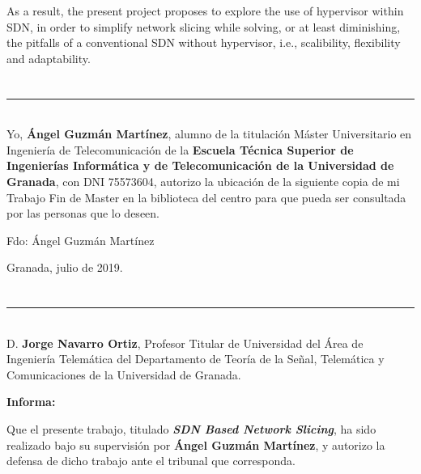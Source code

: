 As a result, the present project proposes to explore the use of hypervisor within SDN, in order to simplify network slicing while solving, or at least diminishing, the pitfalls of a conventional SDN without hypervisor, i.e., scalibility, flexibility and adaptability.

\chapter*{}
\thispagestyle{empty}

\noindent\rule[-1ex]{\textwidth}{2pt}\\[4.5ex]

Yo, \textbf{Ángel Guzmán Martínez}, alumno de la titulación Máster Universitario en Ingeniería de Telecomunicación de la \textbf{Escuela Técnica Superior de Ingenierías Informática y de Telecomunicación de la Universidad de Granada}, con DNI 75573604, autorizo la ubicación de la siguiente copia de mi Trabajo Fin de Master en la biblioteca del centro para que pueda ser consultada por las personas que lo deseen.

\vspace{6cm}

\noindent Fdo: Ángel Guzmán Martínez

\vspace{2cm}

\begin{flushright}
Granada, julio de 2019.
\end{flushright}


\chapter*{}
\thispagestyle{empty}

\noindent\rule[-1ex]{\textwidth}{2pt}\\[4.5ex]

D. \textbf{Jorge Navarro Ortiz}, Profesor Titular de Universidad del Área de Ingeniería Telemática del Departamento de Teoría de la Señal, Telemática y Comunicaciones de la Universidad de Granada.

\vspace{0.5cm}

\textbf{Informa:}

\vspace{0.5cm}

Que el presente trabajo, titulado \textit{\textbf{SDN Based Network Slicing}}, ha sido realizado bajo su supervisión por \textbf{Ángel Guzmán Martínez}, y autorizo la defensa de dicho trabajo ante el tribunal que corresponda.

